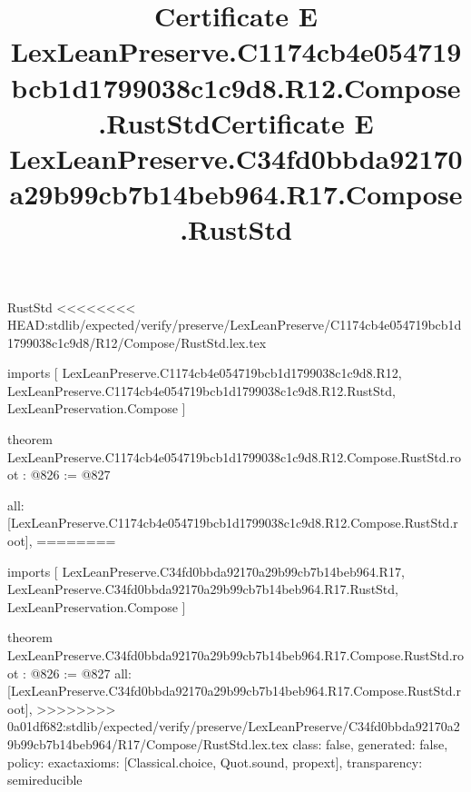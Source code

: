 \begin{lexlean}{RustStd}
<<<<<<<< HEAD:stdlib/expected/verify/preserve/LexLeanPreserve/C1174cb4e054719bcb1d1799038c1c9d8/R12/Compose/RustStd.lex.tex
\title{Certificate E LexLeanPreserve.C1174cb4e054719bcb1d1799038c1c9d8.R12.Compose.RustStd}
\begin{coremodule}
imports [
  LexLeanPreserve.C1174cb4e054719bcb1d1799038c1c9d8.R12,
  LexLeanPreserve.C1174cb4e054719bcb1d1799038c1c9d8.R12.RustStd,
  LexLeanPreservation.Compose
]

theorem LexLeanPreserve.C1174cb4e054719bcb1d1799038c1c9d8.R12.Compose.RustStd.root : @826 := @827 {
  all: [LexLeanPreserve.C1174cb4e054719bcb1d1799038c1c9d8.R12.Compose.RustStd.root],
========
\title{Certificate E LexLeanPreserve.C34fd0bbda92170a29b99cb7b14beb964.R17.Compose.RustStd}
\begin{coremodule}
imports [
  LexLeanPreserve.C34fd0bbda92170a29b99cb7b14beb964.R17,
  LexLeanPreserve.C34fd0bbda92170a29b99cb7b14beb964.R17.RustStd,
  LexLeanPreservation.Compose
]

theorem LexLeanPreserve.C34fd0bbda92170a29b99cb7b14beb964.R17.Compose.RustStd.root : @826 := @827 {
  all: [LexLeanPreserve.C34fd0bbda92170a29b99cb7b14beb964.R17.Compose.RustStd.root],
>>>>>>>> 0a01df682:stdlib/expected/verify/preserve/LexLeanPreserve/C34fd0bbda92170a29b99cb7b14beb964/R17/Compose/RustStd.lex.tex
  class: false,
  generated: false,
  policy: exact{axioms: [Classical.choice, Quot.sound, propext]},
  transparency: semireducible
}


\end{coremodule}}
\end{coremodule}
\end{lexlean}
